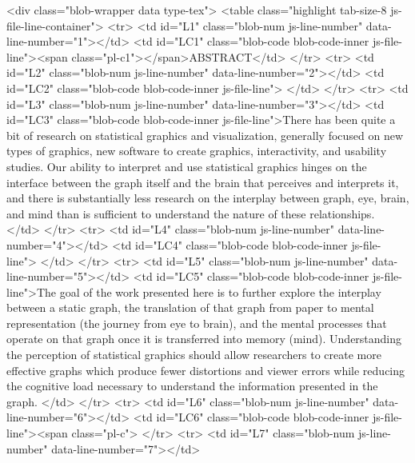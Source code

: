   <div class="blob-wrapper data type-tex">
      <table class="highlight tab-size-8 js-file-line-container">
      <tr>
        <td id="L1" class="blob-num js-line-number" data-line-number="1"></td>
        <td id="LC1" class="blob-code blob-code-inner js-file-line"><span class="pl-c1">\specialchapt</span>{ABSTRACT}</td>
      </tr>
      <tr>
        <td id="L2" class="blob-num js-line-number" data-line-number="2"></td>
        <td id="LC2" class="blob-code blob-code-inner js-file-line">
</td>
      </tr>
      <tr>
        <td id="L3" class="blob-num js-line-number" data-line-number="3"></td>
        <td id="LC3" class="blob-code blob-code-inner js-file-line">There has been quite a bit of research on statistical graphics and visualization, generally focused on new types of graphics, new software to create graphics, interactivity, and usability studies. Our ability to interpret and use statistical graphics hinges on the interface between the graph itself and the brain that perceives and interprets it, and there is substantially less research on the interplay between graph, eye, brain, and mind than is sufficient to understand the nature of these relationships. </td>
      </tr>
      <tr>
        <td id="L4" class="blob-num js-line-number" data-line-number="4"></td>
        <td id="LC4" class="blob-code blob-code-inner js-file-line">
</td>
      </tr>
      <tr>
        <td id="L5" class="blob-num js-line-number" data-line-number="5"></td>
        <td id="LC5" class="blob-code blob-code-inner js-file-line">The goal of the work presented here is to further explore the interplay between a static graph, the translation of that graph from paper to mental representation (the journey from eye to brain), and the mental processes that operate on that graph once it is transferred into memory (mind). Understanding the perception of statistical graphics should allow researchers to create more effective graphs which produce fewer distortions and viewer errors while reducing the cognitive load necessary to understand the information presented in the graph. </td>
      </tr>
      <tr>
        <td id="L6" class="blob-num js-line-number" data-line-number="6"></td>
        <td id="LC6" class="blob-code blob-code-inner js-file-line"><span class="pl-c">%
      </tr>
      <tr>
        <td id="L7" class="blob-num js-line-number" data-line-number="7"></td>
